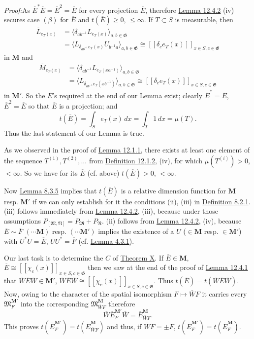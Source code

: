 \documentclass[12pt,b5paper,twoside]{article}
\newcommand{\M}{\mathbf M}
\newcommand{\Proof}{\par\noindent\textit{Proof:}\enspace}
\newcommand{\defref}[1]{\hyperref[def:#1]{Definition #1}}
\newcommand{\lemref}[1]{\hyperref[lem:#1]{Lemma #1}}
\newcommand{\thmref}[1]{\hyperref[thm:#1]{Theorem #1}}
\begin{document}
\Proof As $\overline E^*\overline E=\overline E^2=\overline E$ for every
projection $\overline E$, therefore \lemref{12.4.2} (iv) secures case
$(\beta)$ for
$\overline E$ and $t(\overline E)\geq0$, $\leq\infty$. If $T\subset S$ is
measurable, then
\begin{align*}
 \overline L_{e_T(x)}
 &=\langle\delta_{ab^{-1}}L_{e_T(x)}\rangle_{a,b\in\mathfrak G}\\
 &=\langle L_{\delta_{ab^{-1}}e_T(x)}U_{b^{-1}a}
\rangle_{a,b\in\mathfrak G}
 \cong[[\delta_ce_T(x)]]_{x\in S,c\in\mathfrak G}
\end{align*}
in $\M$ and
\begin{align*}
 \overline M_{e_T(x)}
 &=\langle\delta_{ab^{-1}}L_{e_T(xa^{-1})}\rangle_{a,b\in\mathfrak G}\\
 &=\langle L_{\delta_{ab^{-1}}e_T(xb^{-1})}\rangle_{a,b\in\mathfrak G}
 \cong[[\delta_ce_T(x)]]_{x\in S,c\in\mathfrak G}
\end{align*}
in $\M'$. So the $\overline E$'s required at the end of our Lemma exist;
clearly $\overline E^*=\overline E$, $\overline E^2=\overline E$ so that
$\overline E$ is a projection; and
\[
 t(\overline E)=\int_Se_T(x)\,dx=\int_T1\,dx=\mu(T).
\]
Thus the last statement of our Lemma is true.

As we observed in the proof of \lemref{12.1.1}, there exists at least one
element of the sequence $T^{(1)},T^{(2)},\ldots$ from \defref{12.1.2}, (iv),
for which $\mu(T^{(i)})>0$, $<\infty$. So we have for its $\overline E$
(cf. above) $t(\overline E)>0$, $<\infty$.

Now \lemref{8.3.5} implies that $t(\overline E)$ is a relative dimension
function for $\M$ resp. $\M'$ if we can only establish for it the conditions
(ii), (iii) in \defref{8.2.1}. (iii) follows immediately from
\lemref{12.4.2}, (iii), because under those assumptions
$P_{[\mathfrak M,\mathfrak N]}=P_{\mathfrak M}+P_{\mathfrak N}$. (ii)
follows from \lemref{12.4.2}, (iv), because
$\overline E\sim\overline F$ $(\cdots\M)$ resp. $(\cdots\M')$ implies the
existence of a $U$ ($\in\M$ resp. $\in\M'$) with
$U^*U=\overline E$, $UU^*=\overline F$ (cf. \lemref{4.3.1}).

Our last task is to determine the $C$ of \thmref{X}. If
$\overline E\in\M$, $\overline E\cong
[[\chi_c(x)]]_{x\in S,c\in\mathfrak G}$ then we saw at the end of the proof
of \lemref{12.4.1} that $\overline W\overline E\overline W\in\M'$,
$\overline W\overline E\overline W\cong
[[\chi_c(x)]]_{x\in S,c\in\mathfrak G}$. Thus
$t(\overline E)=t(\overline W\overline E\overline W)$. Now, owing to the
character of the spatial isomorphism $F\mapsto\overline WF$ it carries every
$\mathfrak M_F^{\M'}$ into the corresponding $\mathfrak M_{\overline WF}^{\M}$
therefore
\[
 \overline W\overline E_F^{\M'}\overline W
 =\overline E_{\overline WF}^{\M}.
\]
This proves $t(\overline E_F^{\M'})=t(\overline E_{\overline WF}^{\M})$
and thus, if $\overline WF=\pm F$,
$t(\overline E_F^{\M'})=t(\overline E_F^{\M})$.
\end{document}
